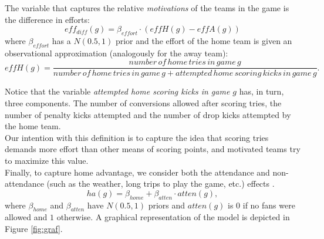 \documentclass[]{article}
\begin{document}
The variable that captures the relative {\em motivations} of the teams in the game is the difference in efforts:
$$ eff_{diff}(g)=\beta_{effort}\cdot(effH(g)-effA(g))$$
where $\beta_{effort}$ has a $N(0.5,1)$ prior and the effort of the home team is given an observational approximation  (analogously for the away team):
$$effH(g)=\dfrac{number\, of\, home\, tries\, in\, game\, g}{number\, of\, home\, tries\, in\, game\, g + attempted\,home\,scoring\, kicks\, in\, game\, g}.$$

Notice that the variable {\em attempted home scoring kicks in game $g$} has, in turn, three components. The number of conversions allowed after scoring tries, the number of penalty kicks attempted and the number of drop kicks attempted by the home team.\\

Our intention with this definition is to capture the idea that scoring tries demands more effort than other means of scoring points, and motivated teams try to maximize this value.\\

Finally, to capture home advantage, we consider both the attendance and non-attendance (such as the weather, long trips to play the game, etc.) effects .
$$ha(g)=\beta_{home}+\beta_{atten}\cdot atten(g),$$
where $\beta_{home}$ and $\beta_{atten}$ have $N(0.5,1)$ priors and $atten(g)$ is $0$ if no fans were allowed and $1$ otherwise. A graphical representation of the model is depicted in Figure \ref{fig:graf}.\\
\end{document}
